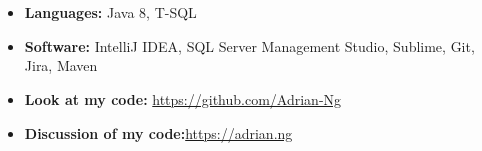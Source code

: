 \documentclass[letterpaper,11pt]{article}
\newcommand{\resumeSubHeadingListStart}{\begin{itemize}[leftmargin=*]}
\newcommand{\resumeSubHeadingListEnd}{\end{itemize}}
\begin{document}
	
	
	\section{}
	\resumeSubHeadingListStart
	\item{
		\textbf{Languages:}{\hfill
			Java 8, T-SQL}
		\hfill
		
		
	}
	\item{
		\textbf{Software:}{\hfill
			IntelliJ IDEA, SQL Server Management Studio, Sublime, Git, Jira, Maven}
	}
	
	\item{
		\textbf{Look at my code:}{\hfill
			\href{https://github.com/Adrian-Ng}{https://github.com/Adrian-Ng}}
		
	}
	\item{
		\textbf{Discussion of my code:}{\hfill \href{https://adrian.ng}{https://adrian.ng}}
	}
	
	\resumeSubHeadingListEnd
	
	
\end{document}
